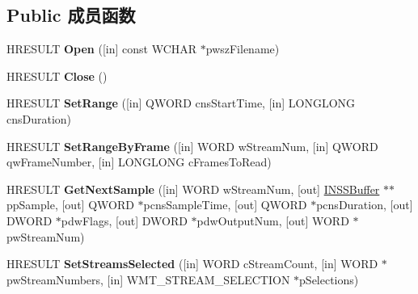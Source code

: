 \subsection*{Public 成员函数}
\begin{DoxyCompactItemize}
\item 
\mbox{\label{interface_i_w_m_sync_reader_a226e9c3c339d2cf02a2e479e15aeb65c}} 
H\+R\+E\+S\+U\+LT {\bfseries Open} (\mbox{[}in\mbox{]} const W\+C\+H\+AR $\ast$pwsz\+Filename)
\item 
\mbox{\label{interface_i_w_m_sync_reader_a690e3fa7dc36b338255f38dcda34f3da}} 
H\+R\+E\+S\+U\+LT {\bfseries Close} ()
\item 
\mbox{\label{interface_i_w_m_sync_reader_ad9dd05e310e2a83a5f9248e49a06b2a2}} 
H\+R\+E\+S\+U\+LT {\bfseries Set\+Range} (\mbox{[}in\mbox{]} Q\+W\+O\+RD cns\+Start\+Time, \mbox{[}in\mbox{]} L\+O\+N\+G\+L\+O\+NG cns\+Duration)
\item 
\mbox{\label{interface_i_w_m_sync_reader_a6736e750368875bd76ad30b5119cc701}} 
H\+R\+E\+S\+U\+LT {\bfseries Set\+Range\+By\+Frame} (\mbox{[}in\mbox{]} W\+O\+RD w\+Stream\+Num, \mbox{[}in\mbox{]} Q\+W\+O\+RD qw\+Frame\+Number, \mbox{[}in\mbox{]} L\+O\+N\+G\+L\+O\+NG c\+Frames\+To\+Read)
\item 
\mbox{\label{interface_i_w_m_sync_reader_ae1365ada2a1ed32884c5ad9243cd87cc}} 
H\+R\+E\+S\+U\+LT {\bfseries Get\+Next\+Sample} (\mbox{[}in\mbox{]} W\+O\+RD w\+Stream\+Num, \mbox{[}out\mbox{]} \hyperlink{interface_i_n_s_s_buffer}{I\+N\+S\+S\+Buffer} $\ast$$\ast$pp\+Sample, \mbox{[}out\mbox{]} Q\+W\+O\+RD $\ast$pcns\+Sample\+Time, \mbox{[}out\mbox{]} Q\+W\+O\+RD $\ast$pcns\+Duration, \mbox{[}out\mbox{]} D\+W\+O\+RD $\ast$pdw\+Flags, \mbox{[}out\mbox{]} D\+W\+O\+RD $\ast$pdw\+Output\+Num, \mbox{[}out\mbox{]} W\+O\+RD $\ast$pw\+Stream\+Num)
\item 
\mbox{\label{interface_i_w_m_sync_reader_a42c0d32050cfcb09548dd2672db17fcc}} 
H\+R\+E\+S\+U\+LT {\bfseries Set\+Streams\+Selected} (\mbox{[}in\mbox{]} W\+O\+RD c\+Stream\+Count, \mbox{[}in\mbox{]} W\+O\+RD $\ast$pw\+Stream\+Numbers, \mbox{[}in\mbox{]} W\+M\+T\+\_\+\+S\+T\+R\+E\+A\+M\+\_\+\+S\+E\+L\+E\+C\+T\+I\+ON $\ast$p\+Selections)
$$
\end{DoxyCompactItemize}
